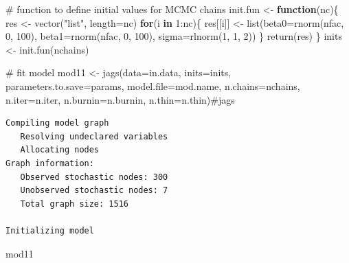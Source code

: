 \documentclass[
  13,
  letterpaper,
]{report}
\newenvironment{Shaded}{\begin{snugshade}}{\end{snugshade}}
\newcommand{\AttributeTok}[1]{\textcolor[rgb]{0.40,0.45,0.13}{#1}}
\newcommand{\CommentTok}[1]{\textcolor[rgb]{0.37,0.37,0.37}{#1}}
\newcommand{\ControlFlowTok}[1]{\textcolor[rgb]{0.00,0.23,0.31}{\textbf{#1}}}
\newcommand{\DecValTok}[1]{\textcolor[rgb]{0.68,0.00,0.00}{#1}}
\newcommand{\FunctionTok}[1]{\textcolor[rgb]{0.28,0.35,0.67}{#1}}
\newcommand{\NormalTok}[1]{\textcolor[rgb]{0.00,0.23,0.31}{#1}}
\newcommand{\OtherTok}[1]{\textcolor[rgb]{0.00,0.23,0.31}{#1}}
\newcommand{\SpecialCharTok}[1]{\textcolor[rgb]{0.37,0.37,0.37}{#1}}
\newcommand{\StringTok}[1]{\textcolor[rgb]{0.13,0.47,0.30}{#1}}
\begin{document}
\begin{Shaded}
\begin{Highlighting}[]
\CommentTok{\# function to define initial values for MCMC chains}
\NormalTok{init.fun }\OtherTok{\textless{}{-}} \ControlFlowTok{function}\NormalTok{(nc)\{}
\NormalTok{    res }\OtherTok{\textless{}{-}} \FunctionTok{vector}\NormalTok{(}\StringTok{"list"}\NormalTok{, }\AttributeTok{length=}\NormalTok{nc)}
    \ControlFlowTok{for}\NormalTok{(i }\ControlFlowTok{in} \DecValTok{1}\SpecialCharTok{:}\NormalTok{nc)\{}
\NormalTok{        res[[i]] }\OtherTok{\textless{}{-}} \FunctionTok{list}\NormalTok{(}\AttributeTok{beta0=}\FunctionTok{rnorm}\NormalTok{(nfac, }\DecValTok{0}\NormalTok{, }\DecValTok{100}\NormalTok{),}
                         \AttributeTok{beta1=}\FunctionTok{rnorm}\NormalTok{(nfac, }\DecValTok{0}\NormalTok{, }\DecValTok{100}\NormalTok{),}
                         \AttributeTok{sigma=}\FunctionTok{rlnorm}\NormalTok{(}\DecValTok{1}\NormalTok{, }\DecValTok{1}\NormalTok{, }\DecValTok{2}\NormalTok{))}
\NormalTok{    \}}
    \FunctionTok{return}\NormalTok{(res)}
\NormalTok{\}}
\NormalTok{inits }\OtherTok{\textless{}{-}} \FunctionTok{init.fun}\NormalTok{(nchains)}

\CommentTok{\# fit model}
\NormalTok{mod11 }\OtherTok{\textless{}{-}} \FunctionTok{jags}\NormalTok{(}\AttributeTok{data=}\NormalTok{in.data, }\AttributeTok{inits=}\NormalTok{inits,}
              \AttributeTok{parameters.to.save=}\NormalTok{params,}
              \AttributeTok{model.file=}\NormalTok{mod.name,}
              \AttributeTok{n.chains=}\NormalTok{nchains, }\AttributeTok{n.iter=}\NormalTok{n.iter,}
              \AttributeTok{n.burnin=}\NormalTok{n.burnin, }\AttributeTok{n.thin=}\NormalTok{n.thin)}\CommentTok{\#jags}
\end{Highlighting}
\end{Shaded}

\begin{verbatim}
Compiling model graph
   Resolving undeclared variables
   Allocating nodes
Graph information:
   Observed stochastic nodes: 300
   Unobserved stochastic nodes: 7
   Total graph size: 1516

Initializing model
\end{verbatim}

\begin{Shaded}
\begin{Highlighting}[]
\NormalTok{mod11}
\end{Highlighting}
\end{Shaded}
\end{document}
